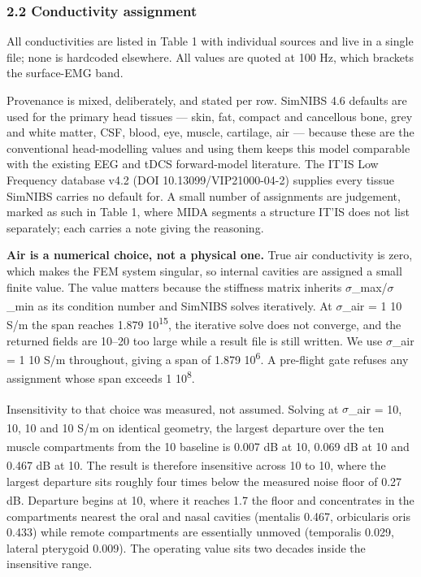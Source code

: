 \documentclass[
  11pt,
  a4paper,
]{article}
\newcounter{none} %
\begin{document}
\subsubsection{2.2 Conductivity assignment}\label{conductivity-assignment}

All conductivities are listed in Table 1 with individual sources and live in a
single file; none is hardcoded elsewhere. All values are quoted at 100 Hz, which
brackets the surface-EMG band.

Provenance is mixed, deliberately, and stated per row. SimNIBS 4.6 defaults are
used for the primary head tissues --- skin, fat, compact and cancellous bone, grey
and white matter, CSF, blood, eye, muscle, cartilage, air --- because these are
the conventional head-modelling values and using them keeps this model
comparable with the existing EEG and tDCS forward-model literature. The IT'IS
Low Frequency database v4.2 (DOI 10.13099/VIP21000-04-2) supplies every tissue
SimNIBS carries no default for. A small number of assignments are judgement,
marked as such in Table 1, where MIDA segments a structure IT'IS does not list
separately; each carries a note giving the reasoning.

\textbf{Air is a numerical choice, not a physical one.} True air conductivity is
zero, which makes the FEM system singular, so internal cavities are assigned a
small finite value. The value matters because the stiffness matrix inherits
$\sigma$\_max/$\sigma$\_min as its condition number and SimNIBS solves iteratively. At
$\sigma$\_air = 1 \texttimes{} 10\textsuperscript{} S/m the span reaches 1.879 \texttimes{} 10\textsuperscript{15}, the iterative solve does
not converge, and the returned fields are 10--20\texttimes{} too large while a result file
is still written. We use $\sigma$\_air = 1 \texttimes{} 10\textsuperscript{} S/m throughout, giving a span of
1.879 \texttimes{} 10\textsuperscript{6}. A pre-flight gate refuses any assignment whose span exceeds
1 \texttimes{} 10\textsuperscript{8}.

Insensitivity to that choice was measured, not assumed. Solving at
$\sigma$\_air = 10\textsuperscript{}, 10\textsuperscript{}, 10\textsuperscript{} and 10\textsuperscript{} S/m on identical geometry, the largest
departure over the ten muscle compartments from the 10\textsuperscript{} baseline is 0.007 dB at
10\textsuperscript{}, 0.069 dB at 10\textsuperscript{} and 0.467 dB at 10\textsuperscript{}. The result is therefore
insensitive across 10\textsuperscript{} to 10\textsuperscript{}, where the largest departure sits roughly four
times below the measured noise floor of 0.27 dB. Departure begins at 10\textsuperscript{}, where
it reaches 1.7\texttimes{} the floor and concentrates in the compartments nearest the oral
and nasal cavities (mentalis \textminus{}0.467, orbicularis oris \textminus{}0.433) while remote
compartments are essentially unmoved (temporalis \textminus{}0.029, lateral pterygoid
\textminus{}0.009). The operating value sits two decades inside the insensitive range.
\end{document}
